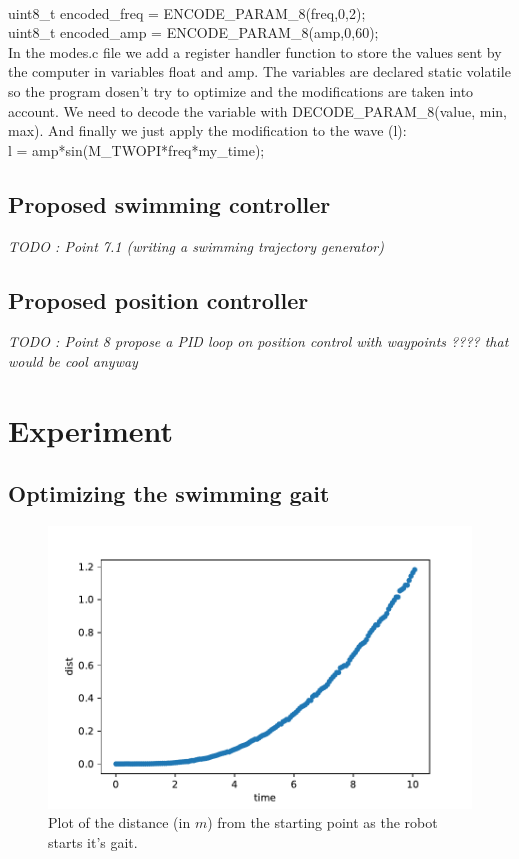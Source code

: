 \documentclass[11pt]{article}
\begin{document}
{\\
uint8\_t encoded\_freq = ENCODE\_PARAM\_8(freq,0,2);
\\
uint8\_t encoded\_amp = ENCODE\_PARAM\_8(amp,0,60);
\\
In the modes.c file we add a register handler function to store the values sent by the computer in variables float and amp. The variables are declared static volatile so the program dosen't try to optimize and the modifications are taken into account. We need to decode the variable with DECODE\_PARAM\_8(value, min, max). And finally we just apply the modification to the wave (l):
\\
l = amp*sin(M\_TWOPI*freq*my\_time);
}

\subsection{Proposed swimming controller}

\textit{TODO : Point 7.1 (writing a swimming trajectory generator)}

\subsection{Proposed position controller}

\textit{TODO : Point 8 propose a PID loop on position control with waypoints ???? that would be cool anyway}

\section{Experiment}

\subsection{Optimizing the swimming gait}

\begin{figure}
    \centering
    \includegraphics{figures/out-20-1_5-1.pdf}
    \caption{Plot of the distance (in $m$) from the starting point as the robot starts it's gait.}
    \label{fig:trajectory_1}
\end{figure}
\end{document}
